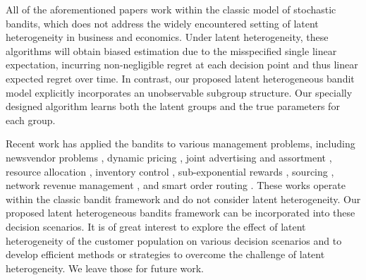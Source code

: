 All of the aforementioned papers work within the classic model of stochastic bandits, which does not address the widely encountered setting of latent heterogeneity in business and economics. Under latent heterogeneity, these algorithms will obtain biased estimation due to the misspecified single linear expectation, incurring non-negligible regret at each decision point and thus linear expected regret over time.
In contrast, our proposed latent heterogeneous bandit model explicitly incorporates an unobservable subgroup structure. Our specially designed algorithm learns both the latent groups and the true parameters for each group. 

Recent work has applied the bandits to various management problems, including newsvendor problems \citep{keskin2023nonstationary}, dynamic pricing \citep{keskin2017chasing,chen2019dynamic,keskin2021dynamic,chen2019welfare,chen2021nonparametric,den2022dynamic,bastani2022meta,keskin2022data,chen2024dynamic,li2024dynamic}, joint advertising and assortment \citep{gao2021assortment,gurkan2023dynamic}, resource allocation \citep{dong2024value}, inventory control \citep{che2024stochastic,qin2023sailing}, sub-exponential rewards \citep{yuan2021marrying}, sourcing \citep{tang2024online}, network revenue management \citep{chen2023network}, and smart order routing \citep{ji2022risk}. These works operate within the classic bandit framework and do not consider latent heterogeneity. Our proposed latent heterogeneous bandits framework can be incorporated into these decision scenarios. It is of great interest to explore the effect of latent heterogeneity of the customer population on various decision scenarios and to develop efficient methods or strategies to overcome the challenge of latent heterogeneity. We leave those for future work.

